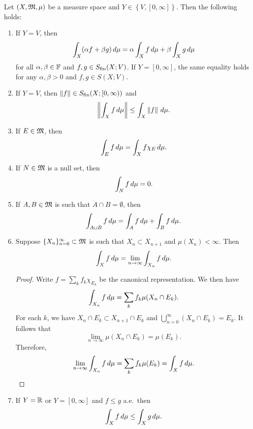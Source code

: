 \documentclass[a4paper]{article}
\renewcommand{\cupinfn}{\bigcup_{n=0}^\infty}
\renewcommand{\seqinfn}[1]{\{ #1 \}_{n=0}^\infty}
\begin{document}
\begin{prop}
  Let $(X, \mathfrak{M}, \mu)$ be a measure space and $Y \in \left\{ V, [0, \infty]
    \right\}$. Then the following holds:
  \begin{enumerate}
    \item If $Y = V$, then
          \[
            \int_X (\alpha f + \beta g) \, d \mu
            = \alpha \int_X f \, d \mu + \beta \int_X
            g \, d \mu
          \]
          for all $\alpha, \beta \in \mathbb{F}$ and $f, g \in S_{\text{fin}}(X ; V)$. If
          $Y = [0, \infty]$, the same equality holds for any $\alpha,
          \beta > 0$ and $f, g \in S(X; V)$.

    \item If $Y = V$, then $\left\lVert f\right\rVert \in S_{\text{fin}}(X; [0, \infty))$ and
          \[
            \left\lVert \int_X f \, d\mu\right\rVert \leq \int_X \left\lVert f\right\rVert \, d\mu.
          \]

    \item If $E \in \mathfrak{M}$, then
          \[
            \int_E f \, d \mu = \int_X f \chi_E \, d \mu.
          \]

    \item If $N \in \mathfrak{M}$ is a null set, then
          \[
            \int_N f \, d \mu = 0.
          \]

    \item If $A, B \in \mathfrak{M}$ is such that $A \cap B = \emptyset$, then
          \[
            \int_{A \cup B} f \, d\mu = \int_A f \, d\mu
            + \int_B f \, d\mu.
          \]

    \item Suppose $\seqinfn{X_n} \subset \mf$ is such that $X_n \subset
          X_{n+1}$ and $\mu(X_n) < \infty$. Then
          \[
            \int_X f \, d \mu = \lim_{n \to \infty}
            \int_{X_n} f \, d\mu.
          \]

          \begin{proof}
            Write $f = \sum_k f_k \chi_{E_k}$ be the canonical
            representation. We then have
            \[
              \int_{X_n} f \, d\mu = \sum_k f_k \mu(X_n \cap E_k).
            \]
            For each $k$, we have $X_n \cap E_k \subset X_{n+1} \cap E_k$
            and $\cupinfn (X_n \cap E_k) = E_k$. It follows that
            \[
              \lim_{n \to \infty} \mu(X_n \cap E_k)
              = \mu(E_k).
            \]
            Therefore,
            \[
              \lim_{n \to \infty} \int_{X_n} f \, d\mu
              = \sum_k f_k \mu(E_k) = \int_X f \, d\mu.
            \]

          \end{proof}

    \item If $Y = \mathbb{R}$ or $Y = [0, \infty]$ and $f \leq g$ a.e.\, then
          \[
            \int_X f \, d\mu \leq \int_X g \, d\mu.
          \]
  \end{enumerate}
\end{prop}
\end{document}
